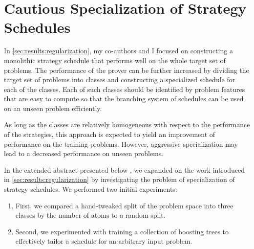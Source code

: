 \section{Cautious Specialization of Strategy Schedules}
\label{sec:results:cautious}

In \cref{sec:results:regularization},
my co-authors and I focused on constructing a monolithic strategy schedule that performs well on the whole target set of problems.
The performance of the prover can be further increased by dividing the target set of problems into classes
and constructing a specialized schedule for each of the classes.
Each of such classes should be identified by problem features that are easy to compute
so that the branching system of schedules can be used on an unseen problem efficiently.

As long as the classes are relatively homogeneous with respect to the performance of the strategies,
this approach is expected to yield an improvement of performance on the training problems.
However, aggressive specialization may lead to a decreased performance on unseen problems.

In the extended abstract presented below \cite{DBLP:conf/paar/BartekC024},
we expanded on the work introduced in \cref{sec:results:regularization}
by investigating the problem of specialization of strategy schedules.
We performed two initial experiments:
\begin{enumerate}
\item First, we compared a hand-tweaked split of the problem space into three classes by the number of atoms to a random split.
\item Second, we experimented with training a collection of boosting trees to effectively tailor a schedule for an arbitrary input problem.
\end{enumerate}


